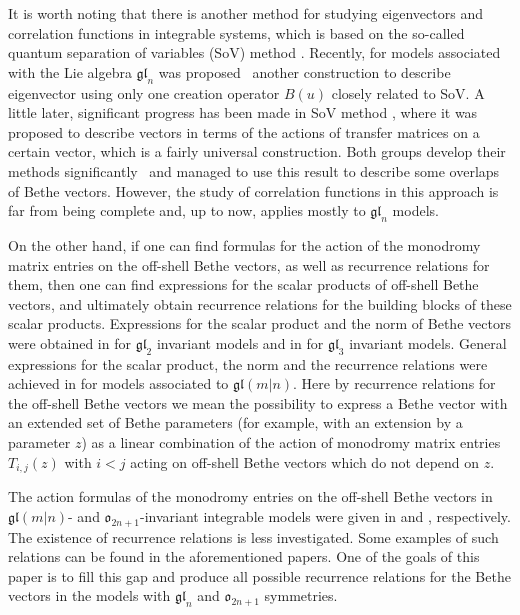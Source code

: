 \documentclass[pdftex]{sigma}
\theoremstyle{definition}
\begin{document}
It is worth noting that there is another method for studying eigenvectors and correlation functions in integrable systems, which is based on the so-called quantum separation of variables (SoV) method \cite{Sk90, Sk95}. Recently,
for models associated with the Lie algebra $\mathfrak{gl}_n$ was proposed~\cite{GLMS17} another construction to describe eigenvector using only one creation operator $B(u)$ closely related to SoV.
A little later, significant progress has been made in SoV method \cite{MN18}, where it was proposed to describe vectors in terms of the actions of transfer matrices on a certain vector, which is a fairly universal construction.
Both groups develop their methods significantly~\cite{GLMR20, MNV20, RV21} and managed to use this result to describe some overlaps of Bethe vectors.
However, the study of correlation functions in this approach is far from being complete and, up to now, applies mostly to $\mathfrak{gl}_n$ models.

On the other hand, if one can find formulas for the action of the
monodromy matrix entries on the off-shell Bethe vectors, as well as recurrence relations
for them, then one can find expressions for the scalar products of off-shell Bethe vectors, and ultimately obtain recurrence relations for the building blocks
of these scalar products. Expressions for the scalar product and the norm of Bethe vectors were obtained in \cite{IzeK84,Kor82} for $\mathfrak{gl}_2$ invariant models and in \cite{Res86} for $\mathfrak{gl}_3$ invariant models.
General expressions for the scalar product, the norm and the recurrence relations were achieved in \cite{HLPRS-SP17,HLPRS-SP18} for models associated to $\mathfrak{gl}(m|n)$.
Here by recurrence relations for the off-shell Bethe
vectors we mean the possibility to express a Bethe vector
with an extended set of Bethe parameters (for example, with an extension by a parameter $z$)
as a linear combination of the action of monodromy matrix entries $T_{i,j}(z)$ with
$i<j$ acting on off-shell Bethe vectors which do not depend on $z$.

The action formulas of the monodromy entries on the off-shell Bethe vectors
in $\mathfrak{gl}(m|n)$- and $\mathfrak{o}_{2n+1}$-invariant integrable models
were given in \cite{HLPRS17b} and \cite{LP2}, respectively.
The existence of recurrence relations is less investigated. Some examples
of such relations can be found in the aforementioned papers. One of
the goals of this paper is to fill this gap and produce all possible
recurrence relations for the Bethe vectors in the models
with $\mathfrak{gl}_{n}$ and $\mathfrak{o}_{2n+1}$ symmetries.
\end{document}
